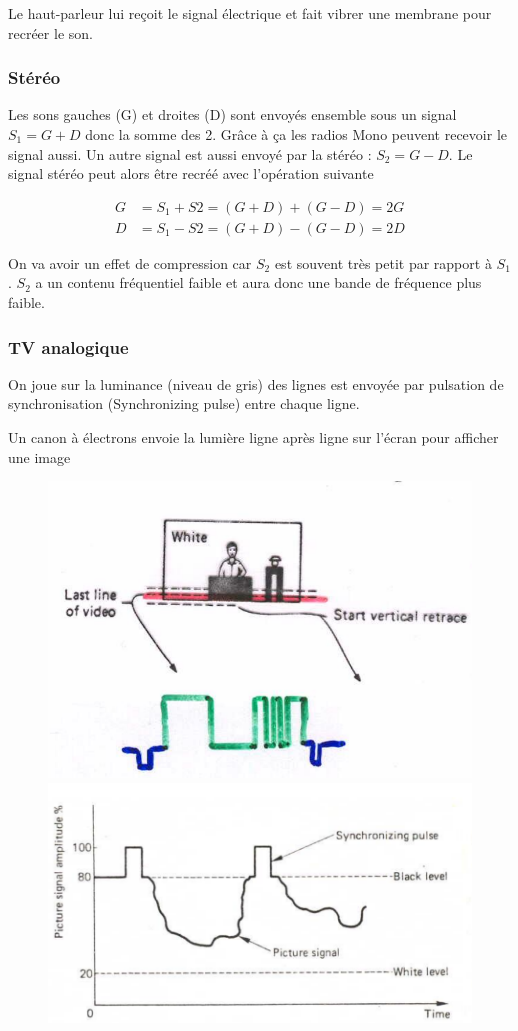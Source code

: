 			Le haut-parleur lui reçoit le signal électrique et fait vibrer une membrane pour recréer le son.
			
			
		\subsubsection{Stéréo}
		
			Les sons gauches (G) et droites (D) sont envoyés ensemble sous un signal $S_1 = G+D$ donc la somme des 2. Grâce à ça les radios Mono peuvent recevoir le signal aussi. Un autre signal est aussi envoyé par la stéréo : $S_2 = G-D$. Le signal stéréo peut alors être recréé avec l'opération suivante


			\begin{align*} 
				G &=  S_1 + S2 = (G+D) + (G-D) = 2G \\ 		
				D &=  S_1 - S2 = (G+D) - (G-D) = 2D
			\end{align*}
			
			On va avoir un effet de compression car $S_2$ est souvent très petit par rapport à $S_1$. $S_2$ a un contenu fréquentiel faible et aura donc une bande de fréquence plus faible.
		
		\subsubsection{TV analogique}
		
			On joue sur la luminance (niveau de gris) des lignes est envoyée par pulsation de synchronisation (Synchronizing pulse) entre chaque ligne.

			Un canon à électrons envoie la lumière ligne après ligne sur l'écran pour afficher une image
			
\begin{figure}[H]
\centering
\begin{minipage}{.5\textwidth}
  \centering
  \includegraphics[width=.5\textwidth]{img/TV1.png}
\end{minipage}%
\begin{minipage}{.5\textwidth}
  \centering
  \includegraphics[width=.5\textwidth]{img/TV2.png}
\end{minipage}
\end{figure}
			

